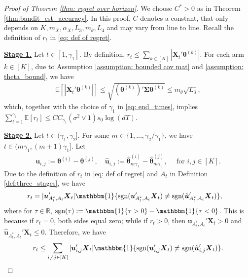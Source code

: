 \documentclass[aos,preprint]{imsart}
\theoremstyle{plain}
\theoremstyle{definition}
\newcommand{\btheta}{\boldsymbol{\theta}}
\newcommand{\hbtheta}{\widehat{\boldsymbol{\theta}}}
\newcommand{\idf}{\mathbbm{1}}
\newcommand{\bX}{\boldsymbol{X}}
\newcommand{\bSigma}{\boldsymbol{\Sigma}}
\newcommand{\bu}{\boldsymbol{u}}
\newcommand{\hbu}{\hat{\boldsymbol{u}}}
\newcommand{\bR}{\mathbb{R}}
\newcommand{\cF}{\mathcal{F}}
\newcommand{\Exp}{\mathbb{E}}
\begin{document}
\begin{proof}[Proof of Theorem \ref{thm: regret over horizon}]
We choose $C^* > 0$ as in Theorem \ref{thm:bandit_est_accuracy}. 
In this proof, $C$ denotes a constant, that only depends on $K,  m_X, \alpha_X,  L_3, m_{\theta}, L_4$ and may vary from line to line. Recall the definition of $r_t$ in \eqref{eq: def of regret}.


\medskip
\noindent \underline{\textbf{Stage 1.}} Let $t \in [1,\gamma_1]$. By definition, $r_t \leq \sum_{k \in [K]} |\bX_t'\btheta^{(k)}|$. For each arm $k \in [K]$, 
due to Assumption \ref{assumption: bounded cov mat} and \ref{assumption: theta_bound}, we have 
\begin{align}\label{trival_bound}
\Exp\left[|\bX_t'\btheta^{(k)}|\right] \leq  \sqrt{ (\btheta^{(k)})'\bSigma \btheta^{(k)} } \leq m_{\theta} \sqrt{L_3},
\end{align}
which, together with the choice of $\gamma_1$ in \eqref{eq: end_times}, implies  $\sum_{t=1}^{\gamma_1} \Exp[r_t] \leq C C_{\gamma_1}(\sigma^2\vee 1) s_0\log(dT)$.

\medskip
\noindent \underline{\textbf{Stage 2.}} Let $t \in (\gamma_1,\gamma_2]$. For some $m \in \{1,\ldots, \gamma_2/\gamma_1\}$, we have $t \in (m\gamma_1,(m+1)\gamma_1]$. Let
\begin{align*}
    \bu_{i,j} := \btheta^{(i)} - \btheta^{(j)}, \quad
    \hat{\bu}_{i,j} := \hbtheta^{(i)}_{m\gamma_1} - \hbtheta^{(j)}_{m \gamma_1}, \quad \text{ for } i,j \in [K].
\end{align*}
Due to the definition of $r_t$ in \eqref{eq: def of regret} and $A_t$ in Definition \ref{def:three_stages}, we have
\begin{align*}
    r_t &= |\bu_{A_t^*,A_t}'\bX_t| \idf\{\textup{sgn}(\bu_{A_t^*,A_t}'\bX_t)\neq \textup{sgn}(\hbu_{A_t^*,A_t}'\bX_t)\},
\end{align*}
where for $\tau \in \bR$, $\textup{sgn}(\tau) := \idf\{\tau > 0\} - \idf\{\tau < 0\}$. This is because if $r_t = 0$, both sides equal zero; while if $r_t > 0$, then $\bu_{A_t^*,A_t}'\bX_t > 0$ and $\hbu_{A_t^*,A_t}'\bX_t \leq 0$. Therefore, we have
\begin{align*}
    r_t\leq \sum_{i \neq j \in [K]}
    |\bu_{i,j}'\bX_t| \idf\{\textup{sgn}(\bu_{i,j}'\bX_t)\neq \textup{sgn}(\hbu_{i,j}'\bX_t)\}.
\end{align*}



\end{proof}
\end{document}
